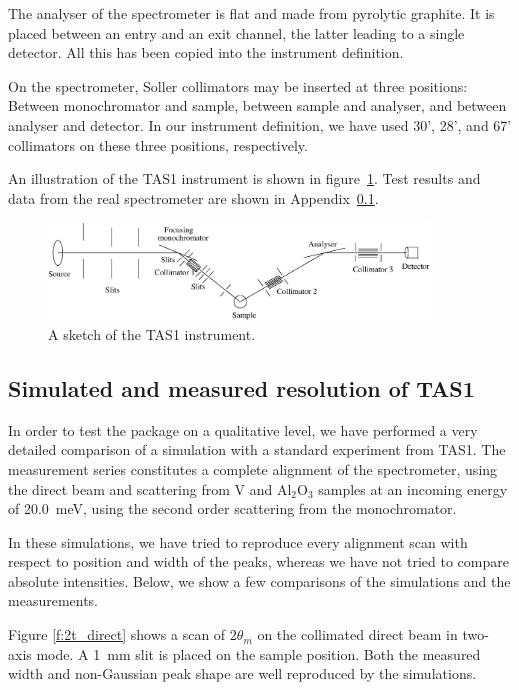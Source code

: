 The analyser of the spectrometer is flat and made from
pyrolytic graphite. It is placed between an entry and
an exit channel, the latter leading to a single detector.
All this has been copied into the instrument definition.

On the spectrometer, Soller collimators may be inserted
at three positions: Between monochromator and sample,
between sample and analyser, and between analyser and detector.
In our instrument definition, we have used 30', 28', and 67' collimators
on these three positions, respectively.

An illustration of the TAS1 instrument
is shown in figure~\ref{f:TAS1}.
Test results and data from the real spectrometer are shown
in Appendix~\ref{data:TAS1}.

\begin{figure}
  \begin{center}
    \includegraphics[width=0.9\textwidth]{figures/tas1.eps}
  \end{center}
\caption{A sketch of the TAS1 instrument.}
\label{f:TAS1}
\end{figure}

\subsection{Simulated and measured resolution of TAS1}
\label{data:TAS1}

In order to test the \MCS package on a qualitative level,
we have performed a very detailed comparison of a simulation with a
standard experiment from TAS1. The measurement series
constitutes a complete alignment of the spectrometer,
using the direct beam and scattering from V and Al$_2$O$_3$
samples at an incoming energy of 20.0~meV, using the second order
scattering from the monochromator.

In these simulations, we have tried to reproduce
every alignment scan with respect to position and width
of the peaks, whereas we have not tried to compare
absolute intensities. Below, we show a few comparisons
of the simulations and the measurements.

Figure \ref{f:2t_direct} shows a scan of
$2\theta_m$ on the collimated direct beam in two-axis mode.
A \hbox{1 mm} slit is placed on the sample position.
Both the measured width and non-Gaussian peak shape
are well reproduced by the \MCS simulations.


